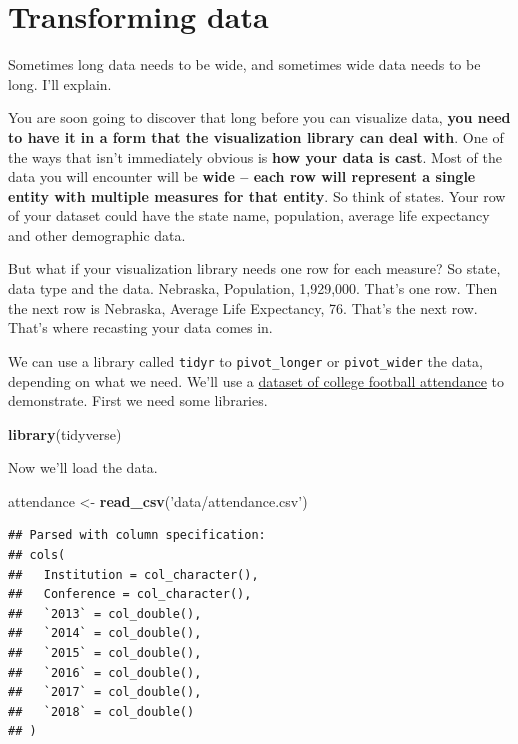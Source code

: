 \documentclass[]{book}
\newenvironment{Shaded}{\begin{snugshade}}{\end{snugshade}}
\newcommand{\KeywordTok}[1]{\textcolor[rgb]{0.13,0.29,0.53}{\textbf{#1}}}
\newcommand{\NormalTok}[1]{#1}
\newcommand{\StringTok}[1]{\textcolor[rgb]{0.31,0.60,0.02}{#1}}
\begin{document}
\hypertarget{transforming-data}{%
\chapter{Transforming data}\label{transforming-data}}

Sometimes long data needs to be wide, and sometimes wide data needs to be long. I'll explain.

You are soon going to discover that long before you can visualize data, \textbf{you need to have it in a form that the visualization library can deal with}. One of the ways that isn't immediately obvious is \textbf{how your data is cast}. Most of the data you will encounter will be \textbf{wide -- each row will represent a single entity with multiple measures for that entity}. So think of states. Your row of your dataset could have the state name, population, average life expectancy and other demographic data.

But what if your visualization library needs one row for each measure? So state, data type and the data. Nebraska, Population, 1,929,000. That's one row. Then the next row is Nebraska, Average Life Expectancy, 76. That's the next row. That's where recasting your data comes in.

We can use a library called \texttt{tidyr} to \texttt{pivot\_longer} or \texttt{pivot\_wider} the data, depending on what we need. We'll use a \href{https://unl.box.com/s/etqna5bfvf3b0gsnw0kcjjn1rxx9335s}{dataset of college football attendance} to demonstrate. First we need some libraries.

\begin{Shaded}
\begin{Highlighting}[]
\KeywordTok{library}\NormalTok{(tidyverse)}
\end{Highlighting}
\end{Shaded}

Now we'll load the data.

\begin{Shaded}
\begin{Highlighting}[]
\NormalTok{attendance <-}\StringTok{ }\KeywordTok{read_csv}\NormalTok{(}\StringTok{'data/attendance.csv'}\NormalTok{)}
\end{Highlighting}
\end{Shaded}

\begin{verbatim}
## Parsed with column specification:
## cols(
##   Institution = col_character(),
##   Conference = col_character(),
##   `2013` = col_double(),
##   `2014` = col_double(),
##   `2015` = col_double(),
##   `2016` = col_double(),
##   `2017` = col_double(),
##   `2018` = col_double()
## )
\end{verbatim}
\end{document}
